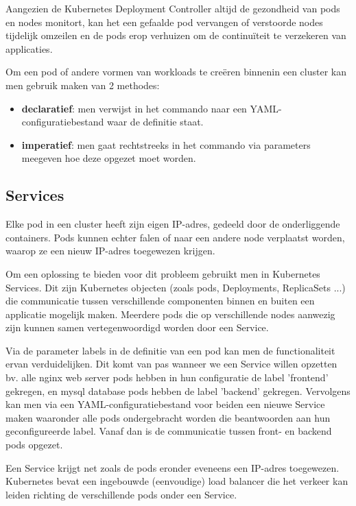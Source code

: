 Aangezien de Kubernetes Deployment Controller altijd de gezondheid van pods en nodes monitort, kan het een gefaalde pod vervangen of verstoorde nodes tijdelijk omzeilen en de pods erop verhuizen om de continuïteit te verzekeren van applicaties. 

Om een pod of andere vormen van workloads te creëren binnenin een cluster kan men gebruik maken van 2 methodes: 
\begin{itemize}
    \item {\bf declaratief}: men verwijst in het commando naar een YAML-configuratiebestand waar de definitie staat.  
    \item {\bf imperatief}: men gaat rechtstreeks in het commando via parameters meegeven hoe deze opgezet moet worden.
\end{itemize}

\subsection{Services}
\label{sec:services}

Elke pod in een cluster heeft zijn eigen IP-adres, gedeeld door de onderliggende containers. Pods kunnen echter falen of naar een andere node verplaatst worden, waarop ze een nieuw IP-adres toegewezen krijgen.

Om een oplossing te bieden voor dit probleem gebruikt men in Kubernetes Services. Dit zijn Kubernetes objecten (zoals pods, Deployments, ReplicaSets ...) die communicatie tussen verschillende componenten binnen en buiten een applicatie mogelijk maken. Meerdere pods die op verschillende nodes aanwezig zijn kunnen samen vertegenwoordigd worden door een Service. 

Via de parameter labels in de definitie van een pod kan men de functionaliteit ervan verduidelijken. Dit komt van pas wanneer we een Service willen opzetten bv. alle nginx web server pods hebben in hun configuratie de label 'frontend' gekregen, en mysql database pods hebben de label 'backend' gekregen. Vervolgens kan men via een YAML-configuratiebestand voor beiden een nieuwe Service maken waaronder alle pods ondergebracht worden die beantwoorden aan hun geconfigureerde label. Vanaf dan is de communicatie tussen front- en backend pods opgezet. 

Een Service krijgt net zoals de pods eronder eveneens een IP-adres toegewezen. Kubernetes bevat een ingebouwde (eenvoudige) load balancer die het verkeer kan leiden richting de verschillende pods onder een Service. 

